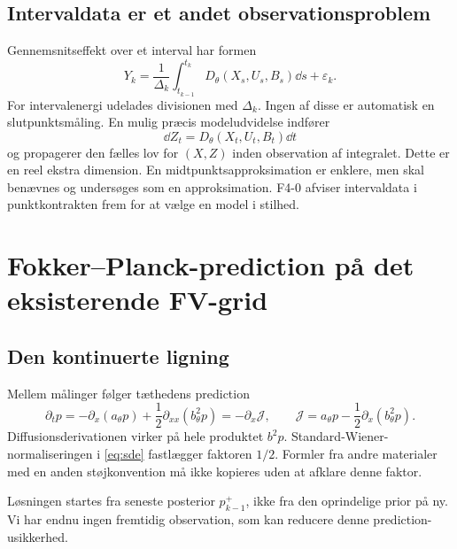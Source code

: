 \subsection{Intervaldata er et andet observationsproblem}
Gennemsnitseffekt over et interval har formen
\begin{equation}
 Y_k=\frac1{\Delta_k}\int_{t_{k-1}}^{t_k}
 D_\theta(X_s,U_s,B_s)\dd s+\varepsilon_k.
 \label{eq:average}
\end{equation}
For intervalenergi udelades divisionen med \(\Delta_k\). Ingen af disse er automatisk en slutpunktsmåling. En mulig præcis modeludvidelse indfører
\begin{equation}
 \dd Z_t=D_\theta(X_t,U_t,B_t)\dd t
 \label{eq:accumulator}
\end{equation}
og propagerer den fælles lov for \((X,Z)\) inden observation af integralet. Dette er en reel ekstra dimension. En midtpunktsapproksimation er enklere, men skal benævnes og undersøges som en approksimation. F4-0 afviser intervaldata i punktkontrakten frem for at vælge en model i stilhed.

\section{Fokker--Planck-prediction på det eksisterende FV-grid}
\subsection{Den kontinuerte ligning}
Mellem målinger følger tæthedens prediction
\begin{equation}
 \partial_t p=-\partial_x(a_\theta p)+\frac12\partial_{xx}(b_\theta^2p)
             =-\partial_x\mathcal J,\qquad
 \mathcal J=a_\theta p-\frac12\partial_x(b_\theta^2p).
 \label{eq:fp}
\end{equation}
Diffusionsderivationen virker på hele produktet \(b^2p\). Standard-Wiener-normaliseringen i \eqref{eq:sde} fastlægger faktoren \(1/2\). Formler fra andre materialer med en anden støjkonvention må ikke kopieres uden at afklare denne faktor.

Løsningen startes fra seneste posterior \(p_{k-1}^+\), ikke fra den oprindelige prior på ny. Vi har endnu ingen fremtidig observation, som kan reducere denne prediction-usikkerhed.

